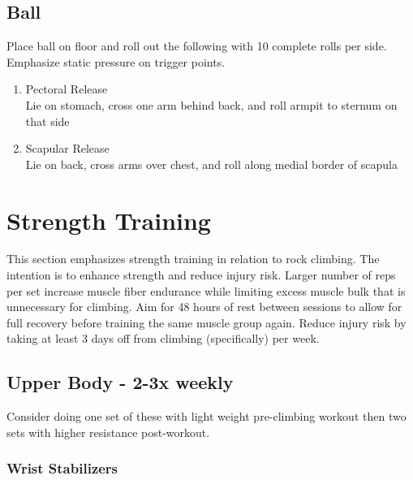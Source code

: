 \documentclass[12pt, letterpaper]{article}
\begin{document}
\subsection{Ball}
Place ball on floor and roll out the following with 10 complete rolls per side. Emphasize static pressure on trigger points.
\begin{enumerate}
    \item Pectoral Release \\ Lie on stomach, cross one arm behind back, and roll armpit to sternum on that side
    \item Scapular Release \\ Lie on back, cross arms over chest, and roll along medial border of scapula
\end{enumerate}

\newpage %


\section{Strength Training}

This section emphasizes strength training in relation to rock climbing.
The intention is to enhance strength and reduce injury risk. Larger number
of reps per set increase muscle fiber endurance while limiting excess 
muscle bulk that is unnecessary for climbing. Aim for 48 hours of rest 
between sessions to allow for full recovery before training the same muscle
 group again. Reduce injury risk by taking at least 3 days off from climbing 
 (specifically) per week.

\subsection{Upper Body - 2-3x weekly}

Consider doing one set of these with light weight pre-climbing workout then two sets with higher resistance post-workout.

\subsubsection{Wrist Stabilizers}
\end{document}
